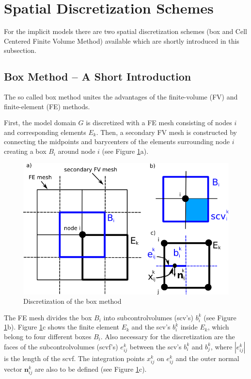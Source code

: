 \section{Spatial Discretization Schemes}
\label{spatialdiscretization}

For the implicit models there are two spatial discretization schemes (box and Cell
Centered Finite Volume Method) available which are shortly introduced
in this subsection.

\subsection{Box Method -- A Short Introduction}\label{box}

The so called box method unites the advantages of the finite-volume (FV) and
finite-element (FE) methods.

First, the model domain $G$ is discretized with a FE mesh consisting of nodes
$i$ and corresponding elements $E_k$. Then, a secondary FV mesh is constructed
by connecting the midpoints and barycenters of the elements surrounding node
$i$ creating a box $B_i$ around node $i$ (see Figure \ref{pc:box}a).

\begin{figure} [ht]
\includegraphics[width=0.8\linewidth,keepaspectratio]{PNG/box_disc.png}
\caption{\label{pc:box} Discretization of the box method}
\end{figure}

The FE mesh divides the box $B_i$ into subcontrolvolumes (scv's) $b^k_i$
(see Figure \ref{pc:box}b). Figure \ref{pc:box}c shows the finite element $E_k$
and the scv's $b^k_i$ inside $E_k$, which belong to four different boxes $B_i$.
Also necessary for the discretization are the faces of the subcontrolvolumes (scvf's)
$e^k_{ij}$ between the scv's $b^k_i$ and $b^k_j$, where $|e^k_{ij}|$ is the length
of the scvf. The integration points $x^k_{ij}$ on $e^k_{ij}$ and the outer normal
vector $\mathbf n^k_{ij}$ are also to be defined (see Figure \ref{pc:box}c).


